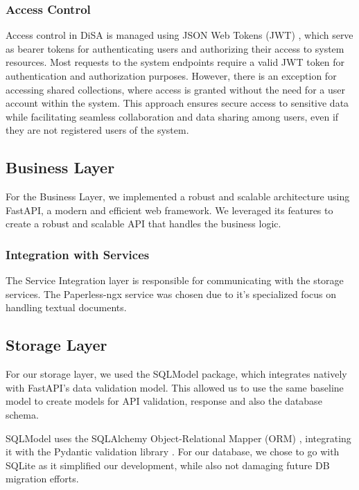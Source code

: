\documentclass[a4paper,11pt]{article}
\begin{document}
        \subsubsection{Access Control}
            \quad Access control in DiSA is managed using JSON Web Tokens (JWT) \cite{JWT}, which serve as bearer tokens for authenticating users and authorizing their access to system resources. Most requests to the system endpoints require a valid JWT token for authentication and authorization purposes. However, there is an exception for accessing shared collections, where access is granted without the need for a user account within the system. This approach ensures secure access to sensitive data while facilitating seamless collaboration and data sharing among users, even if they are not registered users of the system.
        
        \subsection{Business Layer}
            \quad For the Business Layer, we implemented a robust and scalable architecture using FastAPI, a modern and efficient web framework. We leveraged its features to create a robust and scalable API that handles the business logic.
            \subsubsection{Integration with Services}
                \quad The Service Integration layer is responsible for communicating with the storage services. The Paperless-ngx service was chosen due to it's specialized focus on handling textual documents.  
            
        \subsection{Storage Layer}
            \quad For our storage layer, we used the SQLModel \cite{SQLModel} package, which integrates natively with FastAPI's \cite{FastAPI} data validation model. This allowed us to use the same baseline model to create models for API validation, response and also the database schema. 
    
            SQLModel uses the SQLAlchemy Object-Relational Mapper (ORM) \cite{SQLAlchemy}, integrating it with the Pydantic validation library \cite{Pydantic}. For our database, we chose to go with SQLite \cite{SQLite} as it simplified our development, while also not damaging future DB migration efforts.
\end{document}
